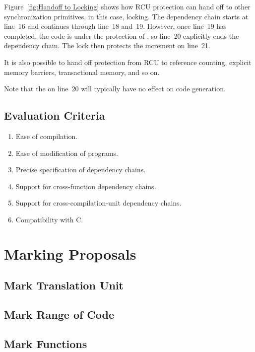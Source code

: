 \documentclass[letterpaper,twocolumn,10pt]{article}
\begin{document}
Figure~\ref{fig:Handoff to Locking}
shows how RCU protection can hand off to other synchronization
primitives, in this case, locking.
The dependency chain starts at line~16 and continues through line~18
and~19.
However, once line~19 has completed, the code is under the protection
of , so line~20 explicitly ends the dependency chain.
The lock then protects the increment on line~21.

It is also possible to hand off protection from RCU to reference counting,
explicit memory barriers, transactional memory, and so on.

Note that the  on line~20 will typically have
no effect on code generation.

\subsection{Evaluation Criteria}
\label{sec:Evaluation Criteria}

\begin{enumerate}
\item	Ease of compilation.
\item	Ease of modification of programs.
\item	Precise specification of dependency chains.
\item	Support for cross-function dependency chains.
\item	Support for cross-compilation-unit dependency chains.
\item	Compatibility with C.
\end{enumerate}

\section{Marking Proposals}
\label{sec:Marking Proposals}

\subsection{Mark Translation Unit}
\label{sec:Mark Translation Unit}

\subsection{Mark Range of Code}
\label{sec:Mark Range of Code}

\subsection{Mark Functions}
\label{sec:Mark Functions}
\end{document}
